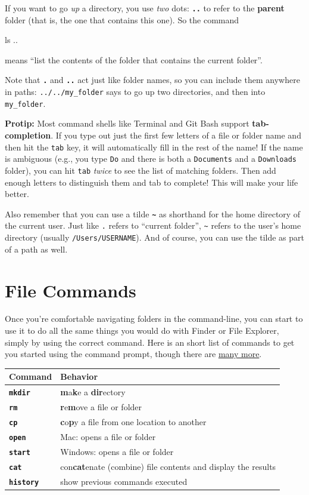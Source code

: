 \documentclass[]{book}
\newenvironment{Shaded}{\begin{snugshade}}{\end{snugshade}}
\newcommand{\FunctionTok}[1]{\textcolor[rgb]{0.00,0.00,0.00}{#1}}
\newcommand{\NormalTok}[1]{#1}
\theoremstyle{definition}
\theoremstyle{definition}
\theoremstyle{remark}
\begin{document}
If you want to go \emph{up} a directory, you use \emph{two} dots:
\textbf{\texttt{..}} to refer to the \textbf{parent} folder (that is,
the one that contains this one). So the command

\begin{Shaded}
\begin{Highlighting}[]
\FunctionTok{ls}\NormalTok{ ..}
\end{Highlighting}
\end{Shaded}

means ``list the contents of the folder that contains the current
folder''.

Note that \textbf{\texttt{.}} and \textbf{\texttt{..}} act just like
folder names, so you can include them anywhere in paths:
\texttt{../../my\_folder} says to go up two directories, and then into
\texttt{my\_folder}.

\textbf{Protip:} Most command shells like Terminal and Git Bash support
\textbf{tab-completion}. If you type out just the first few letters of a
file or folder name and then hit the \texttt{tab} key, it will
automatically fill in the rest of the name! If the name is ambiguous
(e.g., you type \texttt{Do} and there is both a \texttt{Documents} and a
\texttt{Downloads} folder), you can hit \texttt{tab} \emph{twice} to see
the list of matching folders. Then add enough letters to distinguish
them and tab to complete! This will make your life better.

Also remember that you can use a tilde
\textbf{\texttt{\textasciitilde{}}} as shorthand for the home directory
of the current user. Just like \texttt{.} refers to ``current folder'',
\texttt{\textasciitilde{}} refers to the user's home directory (usually
\texttt{/Users/USERNAME}). And of course, you can use the tilde as part
of a path as well.

\section{File Commands}\label{file-commands}

Once you're comfortable navigating folders in the command-line, you can
start to use it to do all the same things you would do with Finder or
File Explorer, simply by using the correct command. Here is an short
list of commands to get you started using the command prompt, though
there are \href{http://www.lagmonster.org/docs/unix/intro-137.html}{many
more}.

\begin{longtable}[]{@{}ll@{}}
\toprule
Command & Behavior\tabularnewline
\midrule
\endhead
\textbf{\texttt{mkdir}} & \textbf{m}a\textbf{k}e a
\textbf{dir}ectory\tabularnewline
\textbf{\texttt{rm}} & \textbf{r}e\textbf{m}ove a file or
folder\tabularnewline
\textbf{\texttt{cp}} & \textbf{c}o\textbf{p}y a file from one location
to another\tabularnewline
\textbf{\texttt{open}} & Mac: opens a file or folder\tabularnewline
\textbf{\texttt{start}} & Windows: opens a file or folder\tabularnewline
\textbf{\texttt{cat}} & con\textbf{cat}enate (combine) file contents and
display the results\tabularnewline
\textbf{\texttt{history}} & show previous commands
executed\tabularnewline
\bottomrule
\end{longtable}
\end{document}
